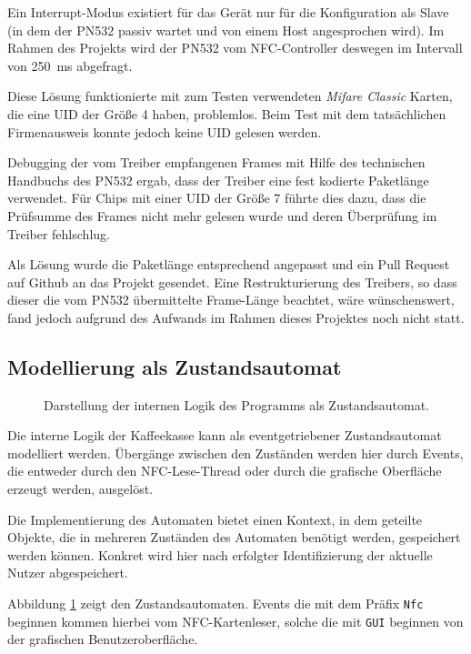 \documentclass[11pt,a4paper]{IEEEtran}
\begin{document}
Ein Interrupt-Modus existiert für das Gerät nur für 
die Konfiguration als Slave (in dem der PN532 passiv wartet und von einem Host
angesprochen wird). Im Rahmen des Projekts wird der PN532 vom NFC-Controller
deswegen im Intervall von \SI{250}{\milli\second} abgefragt.

Diese Lösung funktionierte mit zum Testen verwendeten \emph{Mifare Classic}
Karten, die eine UID der Größe \SI{4}{\byte} haben, problemlos. Beim Test mit
dem tatsächlichen Firmenausweis konnte jedoch keine UID gelesen werden.

Debugging der vom Treiber empfangenen Frames mit Hilfe des technischen Handbuchs
des PN532 ergab, dass der Treiber eine fest kodierte Paketlänge verwendet. Für
Chips mit einer UID der Größe \SI{7}{\byte} führte dies dazu, dass die 
Prüfsumme des Frames nicht mehr gelesen wurde und deren Überprüfung im Treiber
fehlschlug.

Als Lösung wurde die Paketlänge entsprechend angepasst und ein Pull Request auf
Github an das Projekt gesendet\autocite{AdafruitPullRequest}. Eine
Restrukturierung des Treibers, so dass dieser die vom PN532 übermittelte 
Frame-Länge beachtet, wäre wünschenswert, fand jedoch aufgrund des Aufwands
im Rahmen dieses Projektes noch nicht statt.

\subsection{Modellierung als Zustandsautomat}

\begin{figure}[ht!]
    \centering
    
    \caption{Darstellung der internen Logik des Programms als Zustandsautomat.}
    \label{fig:statemachine}
\end{figure}

Die interne Logik der Kaffeekasse kann als eventgetriebener Zustandsautomat 
modelliert werden. Übergänge zwischen den Zuständen werden hier durch Events,
die entweder durch den NFC-Lese-Thread oder durch die grafische Oberfläche
erzeugt werden, ausgelöst. 

Die Implementierung des Automaten bietet einen Kontext, in dem geteilte
Objekte, die in mehreren Zuständen des Automaten benötigt werden, gespeichert 
werden können. Konkret wird hier nach erfolgter Identifizierung der aktuelle
Nutzer abgespeichert.

Abbildung \ref{fig:statemachine} zeigt den Zustandsautomaten. Events die
mit dem Präfix \texttt{Nfc} beginnen kommen hierbei vom NFC-Kartenleser, solche
die mit \texttt{GUI} beginnen von der grafischen Benutzeroberfläche. 
\end{document}
